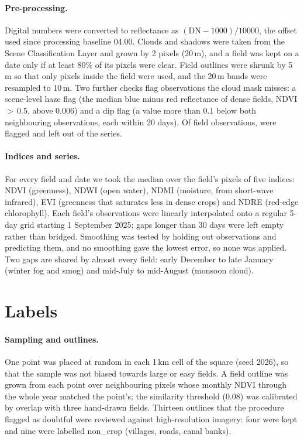 \documentclass[10pt]{article}
\begin{document}
\paragraph{Pre-processing.} Digital numbers were converted to reflectance as
$(\mathrm{DN}-1000)/10000$, the offset used since processing baseline 04.00. Clouds and shadows were
taken from the Scene Classification Layer and grown by 2 pixels (20\,m), and a field was kept on a
date only if at least 80\% of its pixels were clear. Field outlines were shrunk by 5\,m so that only
pixels inside the field were used, and the 20\,m bands were resampled to 10\,m. Two further checks
flag observations the cloud mask misses: a scene-level haze flag (the median blue minus red reflectance
of dense fields, NDVI\,$>$\,0.5, above 0.006) and a dip flag (a value more than 0.1 below both
neighbouring observations, each within 20 days). Of \NObs{} field observations, \NFlagged{} were
flagged and left out of the series.

\paragraph{Indices and series.} For every field and date we took the median over the field's pixels of
five indices: NDVI (greenness), NDWI (open water), NDMI (moisture, from short-wave infrared), EVI
(greenness that saturates less in dense crops) and NDRE (red-edge chlorophyll). Each field's
observations were linearly interpolated onto a regular 5-day grid starting 1 September 2025; gaps longer
than 30 days were left empty rather than bridged. Smoothing was tested by holding out observations and
predicting them, and no smoothing gave the lowest error, so none was applied. Two gaps are shared by
almost every field: early December to late January (winter fog and smog) and mid-July to mid-August
(monsoon cloud).


\section{Labels}

\paragraph{Sampling and outlines.} One point was placed at random in each 1\,km cell of the square
(seed 2026), so that the sample was not biased towards large or easy fields. A field outline was grown
from each point over neighbouring pixels whose monthly NDVI through the whole year matched the point's;
the similarity threshold (0.08) was calibrated by overlap with three hand-drawn fields. Thirteen
outlines that the procedure flagged as doubtful were reviewed against high-resolution imagery: four were
kept and nine were labelled non\_crop (villages, roads, canal banks).
\end{document}
